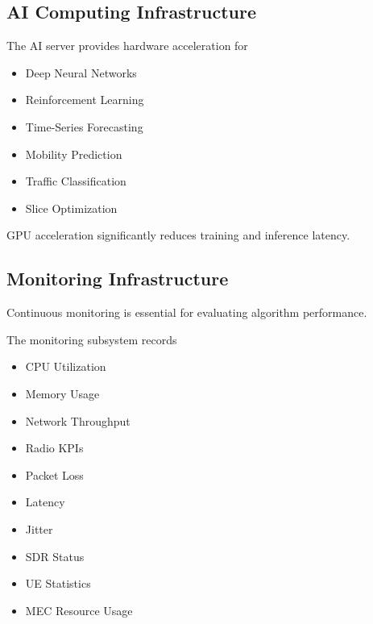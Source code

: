 \documentclass[12pt,a4paper]{article}\usepackage[a4paper,margin=1in]{geometry}\usepackage{graphicx}\usepackage{longtable}\usepackage{booktabs}\usepackage{hyperref}\usepackage{enumitem}\usepackage{amsmath}\usepackage{tikz}\usepackage{pgfgantt}\usepackage{setspace}\setstretch{1.15}\usetikzlibrary{positioning,arrows.meta,shapes.geometric}
\begin{document}
	\subsection{AI Computing Infrastructure}
	
	The AI server provides hardware acceleration for
	
	\begin{itemize}
		
		\item Deep Neural Networks
		
		\item Reinforcement Learning
		
		\item Time-Series Forecasting
		
		\item Mobility Prediction
		
		\item Traffic Classification
		
		\item Slice Optimization
		
	\end{itemize}
	
	GPU acceleration significantly reduces training and inference latency.
	
	
	\subsection{Monitoring Infrastructure}
	
	Continuous monitoring is essential for evaluating algorithm performance.
	
	The monitoring subsystem records
	
	\begin{itemize}
		
		\item CPU Utilization
		
		\item Memory Usage
		
		\item Network Throughput
		
		\item Radio KPIs
		
		\item Packet Loss
		
		\item Latency
		
		\item Jitter
		
		\item SDR Status
		
		\item UE Statistics
		
		\item MEC Resource Usage
		
	\end{itemize}
	
\end{document}
